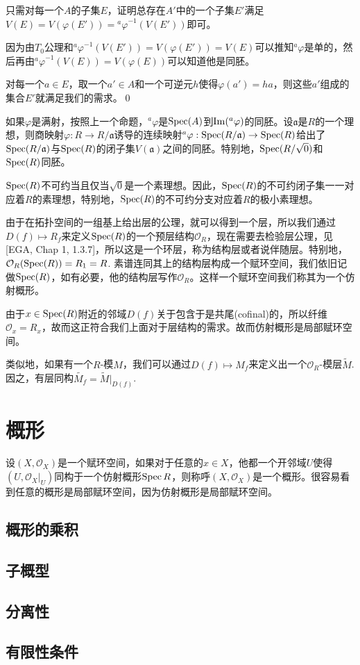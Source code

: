 \proof 只需对每一个$A$的子集$E$，证明总存在$A'$中的一个子集$E'$满足$V(E)=V(\varphi(E'))={^a\varphi}^{-1}(V(E'))$即可。

因为由$T_0$公理和${^a\varphi}^{-1}(V(E'))=V(\varphi(E'))=V(E)$可以推知${^a\varphi}$是单的，然后再由${^a\varphi}^{-1}(V(E))=V(\varphi(E))$可以知道他是同胚。

对每一个$a\in E$，取一个$a'\in A$和一个可逆元$h$使得$\varphi(a')=ha$，则这些$a'$组成的集合$E'$就满足我们的需求。\qed


\para 如果$\varphi$是满射，按照上一个命题，$^a\varphi$是$\operatorname{Spec}(A)$到$\operatorname{Im} (^a\varphi)$的同胚。设$\mathfrak{a}$是$R$的一个理想，则商映射$\varphi:R\to R/\mathfrak{a}$诱导的连续映射$^a\varphi:\operatorname{Spec}(R/\mathfrak{a})\to \operatorname{Spec}(R)$给出了$\operatorname{Spec}(R/\mathfrak{a})$与$\operatorname{Spec}(R)$的闭子集$V(\mathfrak{a})$之间的同胚。特别地，$\operatorname{Spec}(R/\sqrt{0})$和$\operatorname{Spec}(R)$同胚。

\para $\operatorname{Spec}(R)$不可约当且仅当$\sqrt{0}$是一个素理想。因此，$\operatorname{Spec}(R)$的不可约闭子集一一对应着$R$的素理想，特别地，$\operatorname{Spec}(R)$的不可约分支对应着$R$的极小素理想。

\para 由于在拓扑空间的一组基上给出层的公理，就可以得到一个层，所以我们通过$D(f)\mapsto R_f$来定义$\operatorname{Spec}(R)$的一个预层结构$\mathcal{O}_R$，现在需要去检验层公理，见[EGA, Chap 1, 1.3.7]，所以这是一个环层，称为结构层或者说伴随层。特别地，$\mathcal{O}_R(\operatorname{Spec}(R))=R_1=R$. 素谱连同其上的结构层构成一个赋环空间，我们依旧记做$\operatorname{Spec}(R)$，如有必要，他的结构层写作$\mathcal{O}_R$。这样一个赋环空间我们称其为一个仿射概形。

由于$x\in \operatorname{Spec}(R)$附近的邻域$D(f)$关于包含于是共尾(cofinal)的，所以纤维$\mathcal{O}_x=R_x$，故而这正符合我们上面对于层结构的需求。故而仿射概形是局部赋环空间。

\para 类似地，如果有一个$R$-模$M$，我们可以通过$D(f)\mapsto M_f$来定义出一个$\mathcal{O}_R$-模层$\widetilde{M}$. 因之，有层同构$\widetilde{M_f}=\widetilde{M}|_{D(f)}$.

\section{概形}

\para 设$(X,\mathcal{O}_X)$是一个赋环空间，如果对于任意的$x\in X$，他都一个开邻域$U$使得$(U,\mathcal{O}_X|_U)$同构于一个仿射概形$\operatorname{Spec}{R}$，则称呼$(X,\mathcal{O}_X)$是一个概形。很容易看到任意的概形是局部赋环空间，因为仿射概形是局部赋环空间。

\subsection{概形的乘积}

\subsection{子概型}

\subsection{分离性}

\subsection{有限性条件}